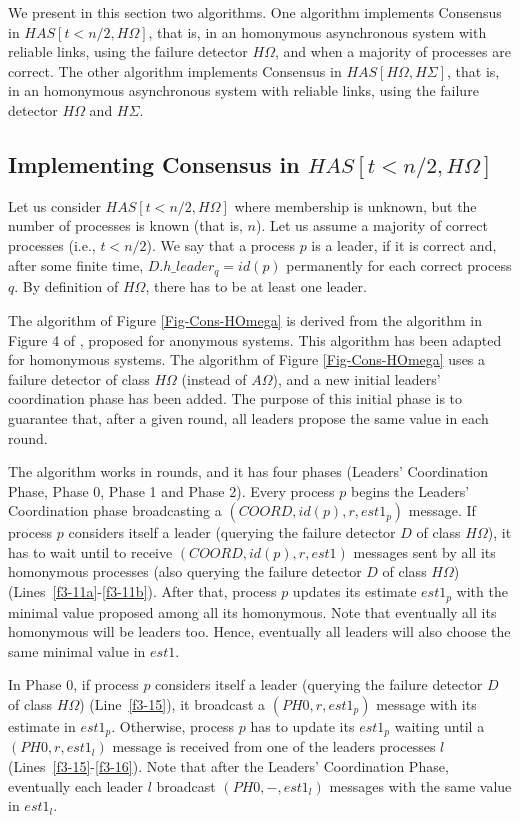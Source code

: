 \documentclass[10pt, conference, compsocconf]{IEEEtran}
\newcommand{\HO}{{H\Omega}}
\newcommand{\AO}{{A\Omega}}
\newcommand{\HS}{{H\Sigma}}
\newcommand{\leader}{{\mathit{h\_leader}}}
\begin{document}
We present in this section two algorithms. One algorithm implements 
Consensus in $\mathit{HAS}[t < n/2,\HO]$, that is,
in an homonymous asynchronous system with reliable links, using the failure
detector $\HO$,  
and when a majority of processes are correct. 
The other algorithm implements Consensus in $\mathit{HAS}[\HO,\HS]$, that is,
in an homonymous asynchronous system with reliable links, using the failure
detector $\HO$ and $\HS$.  


\subsection{Implementing Consensus in $\mathit{HAS}[t < n/2,\HO]$}
Let us  consider $\mathit{HAS}[t < n/2,\HO]$ where  membership is unknown,
but the number of processes is known (that is, $n$). 
Let us assume a majority of correct processes (i.e., $t < n/2$).
We say  that a process $p$  is a leader, if  it is correct  and, after some
finite  time,  $D.\leader_q=id(p)$  permanently  for each  correct  process
$q$. By definition of $\HO$, there has to be at least one leader. 

The algorithm of Figure \ref{Fig-Cons-HOmega} is derived from the algorithm
in  Figure  4 of  \cite{DBLP:conf/aina/BonnetR10},  proposed for  anonymous
systems. This algorithm has been adapted for homonymous  
systems.  The  algorithm of  Figure  \ref{Fig-Cons-HOmega}  uses a  failure
detector  of class $\HO$  (instead of  $\AO$), and  a new  initial leaders'
coordination phase has been added. The  purpose of this initial phase is to
guarantee that, after a given round,  all leaders propose the same value in
each round. 

The  algorithm  works   in  rounds,  and  it  has   four  phases  (Leaders'
Coordination Phase, Phase 0, Phase 1 and Phase 2).  
Every  process $p$ begins  the Leaders'  Coordination phase  broadcasting a
$(COORD,id(p),r,est1_p)$ message. 
If process $p$ considers itself a leader (querying the failure detector $D$
of class $\HO$), it has to wait 
 until  to   receive  $(COORD,id(p),r,est1)$  messages  sent   by  all  its
homonymous  processes (also  querying  the failure  detector  $D$ of  class
$\HO$) (Lines~\ref{f3-11a}-\ref{f3-11b}).  After that, process  $p$ updates
its estimate $est1_p$ with the minimal value  
proposed among all its homonymous.  Note that eventually all its homonymous
will be leaders too. Hence, eventually  
all leaders will also choose the same minimal value in $est1$. 

In Phase 0, if process $p$  considers itself a leader (querying the failure
detector $D$ of class $\HO$) (Line~\ref{f3-15}), 
it   broadcast   a   $(PH0,r,est1_p)$   message  with   its   estimate   in
$est1_p$. Otherwise, process $p$ has to update its $est1_p$ waiting until a
$(PH0,r,est1_l)$ message is received from  one of the leaders processes $l$
(Lines~\ref{f3-15}-\ref{f3-16}).  
Note that after the Leaders' Coordination Phase, eventually each leader $l$
broadcast $(PH0,-,est1_l)$ messages with the same value in $est1_l$. 
\end{document}

